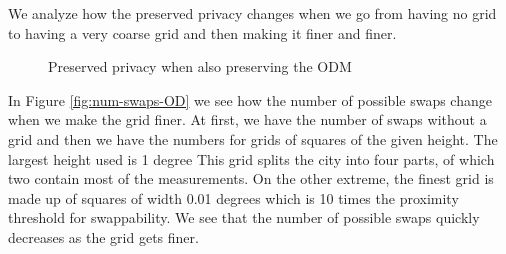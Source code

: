 \documentclass[times,twocolumn,final,authoryear]{elsarticle}
\begin{document}
We analyze how the preserved privacy changes when we go from having
no grid to having a very coarse grid and then making it finer and
finer.

\begin{figure}
\centering
  \caption{Preserved privacy when also preserving the ODM}
  \label{fig:OD}
\end{figure}

In Figure \ref{fig:num-swaps-OD} we see how the number of possible
swaps change when we make the grid finer. At first, we have the number
of swaps without a grid and then we have the numbers for grids of
squares of the given height. The largest height used is 1 degree
This grid splits the city into four parts, of which two contain
most of the measurements. On the other extreme, the finest grid is made up of squares of width 0.01 degrees which is 10 times the proximity threshold for swappability.  
We see that the number of possible swaps quickly decreases as the grid
gets finer. 
\end{document}
